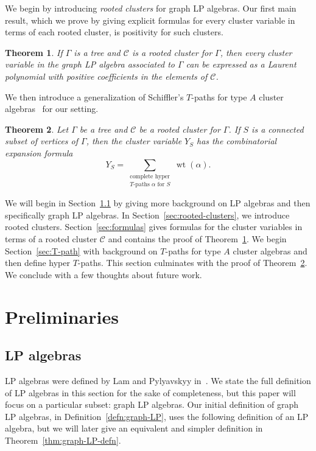 \documentclass[pdftex]{sigma}
\numberwithin{equation}{section}
\newtheorem{Theorem}{Theorem}[section]
\DeclareMathOperator{\wt}{wt}
\newcommand{\calC}{\mathcal{C}}
\begin{document}
We begin by introducing \emph{rooted clusters} for graph LP algebras. Our first main result, which we prove by giving explicit formulas for every cluster variable in terms of each rooted cluster, is positivity for such clusters.

\begin{Theorem}\label{thm:main1}
If $\Gamma$ is a tree and $\calC$ is a rooted cluster for $\Gamma$, then every cluster variable in the graph LP algebra associated to $\Gamma$ can be expressed as a Laurent polynomial with positive coefficients in the elements of $\calC$.
\end{Theorem}

We then introduce a generalization of Schiffler's $T$-paths for type $A$ cluster algebras~\cite{S-08} for our setting.

\begin{Theorem}
\label{thm:main2}
Let $\Gamma$ be a tree and $\calC$ be a rooted cluster for $\Gamma$. If $S$ is a connected subset of vertices of $\Gamma$, then the cluster variable $Y_S$ has the combinatorial expansion formula \[Y_S=\sum_{\substack{\text{complete hyper}\\T\text{-paths }\alpha\text{ for }S}}\wt(\alpha).\]
\end{Theorem}

We will begin in Section~\ref{sec:LP} by giving more background on LP algebras and then specifically graph LP algebras. In Section~\ref{sec:rooted-clusters}, we introduce rooted clusters. Section~\ref{sec:formulas} gives formulas for the cluster variables in terms of a rooted cluster $\calC$ and contains the proof of Theorem~\ref{thm:main1}. We begin Section~\ref{sec:T-path} with background on $T$-paths for type $A$ cluster algebras and then define hyper $T$-paths. This section culminates with the proof of Theorem~\ref{thm:main2}. We conclude with a few thoughts about future work.

\section{Preliminaries}\label{sec:prelim}

\subsection{LP algebras}\label{sec:LP}

LP algebras were defined by Lam and Pylyavskyy in~\cite{LP-12}. We state the full definition of LP algebras in this section for the sake of completeness, but this paper will focus on a particular subset: graph LP algebras. Our initial definition of graph LP algebras, in Definition~\ref{defn:graph-LP}, uses the following definition of an LP algebra, but we will later give an equivalent and simpler definition in Theorem~\ref{thm:graph-LP-defn}.
\end{document}

